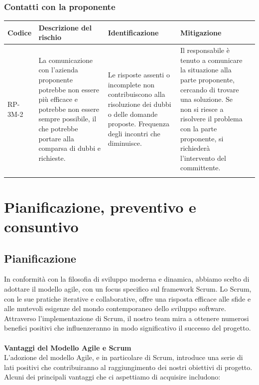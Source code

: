 \documentclass{article}
\begin{document}
\newpage
\subsubsection{Contatti con la proponente}
\begin{table}[h]
    \centering
    \begin{tabularx}{\textwidth}{l>{\RaggedRight}X>{\RaggedRight}X>{\RaggedRight}X>{\RaggedRight}X}
    \toprule
    \rowcolor{gray!50}
    \textbf{Codice} & \textbf{Descrizione del rischio} & \textbf{Identificazione} & \textbf{Mitigazione} \\
    \midrule
    \addlinespace 
    RP-3M-2 & 
    La comunicazione con l'azienda proponente potrebbe non essere più efficace e potrebbe non essere sempre possibile, il che potrebbe portare alla comparsa di dubbi e richieste. & 
    Le risposte assenti o incomplete non contribuiscono alla risoluzione dei dubbi o delle domande proposte. Frequenza degli incontri che diminuisce.&
    Il responsabile è tenuto a comunicare la situazione alla parte proponente, cercando di trovare una soluzione. Se non si riesce a risolvere il problema con la parte proponente, si richiederà l’intervento del committente. \\
    \bottomrule
    \addlinespace 
    \end{tabularx}
\end{table}

\section{Pianificazione, preventivo e consuntivo}
\subsection{Pianificazione}
In conformità con la filosofia di sviluppo moderna e dinamica, abbiamo scelto di adottare il modello agile, con un focus specifico sul framework Scrum.
Lo Scrum, con le sue pratiche iterative e collaborative, offre una risposta efficace alle sfide e alle mutevoli esigenze del mondo contemporaneo dello sviluppo software.\\
Attraverso l'implementazione di Scrum, il nostro team mira a ottenere numerosi benefici positivi che influenzeranno in modo significativo il successo del progetto.
\\
\\
\textbf{Vantaggi del Modello Agile e Scrum}
\\L'adozione del modello Agile, e in particolare di Scrum, introduce una serie di lati positivi che contribuiranno al raggiungimento dei nostri obiettivi di progetto.
Alcuni dei principali vantaggi che ci aspettiamo di acquisire includono:
\end{document}
